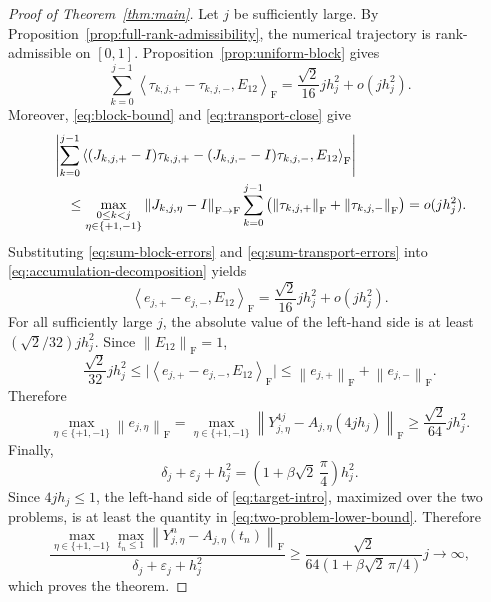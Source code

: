 \documentclass[]{article}
\numberwithin{equation}{section}
\theoremstyle{plain}
\theoremstyle{remark}
\newcommand{\F}{\mathrm F}
\newcommand{\norm}[1]{\left\lVert #1\right\rVert}
\newcommand{\ip}[2]{\left\langle #1,#2\right\rangle_{\F}}
\newcommand{\eps}{\varepsilon}
\begin{document}
\begin{proof}[Proof of Theorem~\ref{thm:main}]
Let $j$ be sufficiently large.  By
Proposition~\ref{prop:full-rank-admissibility}, the numerical trajectory
is rank-admissible on $[0,1]$.  Proposition~\ref{prop:uniform-block}
gives
\begin{equation}\label{eq:sum-block-errors}
 \sum_{k=0}^{j-1}
 \ip{\tau_{k,j,+}-\tau_{k,j,-}}{E_{12}}
 =\frac{\sqrt2}{16}jh_j^2+o(jh_j^2).
\end{equation}
Moreover, \eqref{eq:block-bound} and \eqref{eq:transport-close} give
\begin{align}
 &\left|\sum_{k=0}^{j-1}
 \ip{(J_{k,j,+}-I)\tau_{k,j,+}
 -(J_{k,j,-}-I)\tau_{k,j,-}}{E_{12}}\right|\notag\\
 &\quad\le
 \max_{\substack{0\le k<j\\ \eta\in\{+1,-1\}}}
 \norm{J_{k,j,\eta}-I}_{\F\to\F}
 \sum_{k=0}^{j-1}
 \left(\norm{\tau_{k,j,+}}_{\F}+\norm{\tau_{k,j,-}}_{\F}\right)
 =o(jh_j^2).
 \label{eq:sum-transport-errors}
\end{align}
Substituting \eqref{eq:sum-block-errors} and
\eqref{eq:sum-transport-errors} into
\eqref{eq:accumulation-decomposition} yields
\begin{equation}\label{eq:accumulated}
 \ip{e_{j,+}-e_{j,-}}{E_{12}}
 =\frac{\sqrt2}{16}jh_j^2+o(jh_j^2).
\end{equation}
For all sufficiently large $j$, the absolute value of the left-hand
side is at least $(\sqrt2/32)jh_j^2$.  Since $\norm{E_{12}}_{\F}=1$,
\begin{equation*}
 \frac{\sqrt2}{32}jh_j^2
 \le\bigl|\ip{e_{j,+}-e_{j,-}}{E_{12}}\bigr|
 \le\norm{e_{j,+}}_{\F}+\norm{e_{j,-}}_{\F}.
\end{equation*}
Therefore
\begin{equation}\label{eq:two-problem-lower-bound}
 \max_{\eta\in\{+1,-1\}}\norm{e_{j,\eta}}_{\F}
 =\max_{\eta\in\{+1,-1\}}
 \norm{Y_{j,\eta}^{4j}-A_{j,\eta}(4jh_j)}_{\F}
 \ge\frac{\sqrt2}{64}jh_j^2.
\end{equation}
Finally,
\[
 \delta_j+\eps_j+h_j^2
 =\left(1+\beta\sqrt2\,\frac\pi4\right)h_j^2.
\]
Since $4jh_j\le1$, the left-hand side of
\eqref{eq:target-intro}, maximized over the two problems, is at least
the quantity in \eqref{eq:two-problem-lower-bound}.  Therefore
\begin{equation*}
 \frac{
  \displaystyle\max_{\eta\in\{+1,-1\}}\max_{t_n\le1}
  \norm{Y_{j,\eta}^n-A_{j,\eta}(t_n)}_{\F}}
 {\delta_j+\eps_j+h_j^2}
 \ge
 \frac{\sqrt2}{64(1+\beta\sqrt2\,\pi/4)}j
 \longrightarrow\infty,
\end{equation*}
which proves the theorem.
\end{proof}
\end{document}
